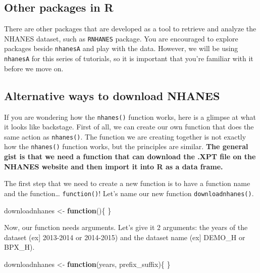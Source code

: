 \documentclass[
]{book}
\newenvironment{Shaded}{\begin{snugshade}}{\end{snugshade}}
\newcommand{\ControlFlowTok}[1]{\textcolor[rgb]{0.13,0.29,0.53}{\textbf{#1}}}
\newcommand{\NormalTok}[1]{#1}
\newcommand{\OtherTok}[1]{\textcolor[rgb]{0.56,0.35,0.01}{#1}}
\begin{document}
\hypertarget{other-packages-in-r}{%
\subsection{Other packages in R}\label{other-packages-in-r}}

There are other packages that are developed as a tool to retrieve and analyze the NHANES dataset, such as \texttt{RNHANES} package. You are encouraged to explore packages beside \texttt{nhanesA} and play with the data. However, we will be using \texttt{nhanesA} for this series of tutorials, so it is important that you're familiar with it before we move on.

\hypertarget{alternative-ways-to-download-nhanes}{%
\subsection{Alternative ways to download NHANES}\label{alternative-ways-to-download-nhanes}}

If you are wondering how the \texttt{nhanes()} function works, here is a glimpse at what it looks like backstage. First of all, we can create our own function that does the same action as \texttt{nhanes()}. The function we are creating together is not exactly how the \texttt{nhanes()} function works, but the principles are similar. \textbf{The general gist is that we need a function that can download the .XPT file on the NHANES website and then import it into R as a data frame.}

The first step that we need to create a new function is to have a function name and the function\ldots{} \texttt{function()}! Let's name our new function \texttt{downloadnhanes()}.

\begin{Shaded}
\begin{Highlighting}[]
\NormalTok{downloadnhanes }\OtherTok{\textless{}{-}} \ControlFlowTok{function}\NormalTok{()\{}
\NormalTok{\}}
\end{Highlighting}
\end{Shaded}

Now, our function needs arguments. Let's give it 2 arguments: the years of the dataset (ex{]} 2013-2014 or 2014-2015) and the dataset name (ex{]} DEMO\_H or BPX\_H).

\begin{Shaded}
\begin{Highlighting}[]
\NormalTok{downloadnhanes }\OtherTok{\textless{}{-}} \ControlFlowTok{function}\NormalTok{(years, prefix\_suffix)\{}
\NormalTok{\}}
\end{Highlighting}
\end{Shaded}
\end{document}
